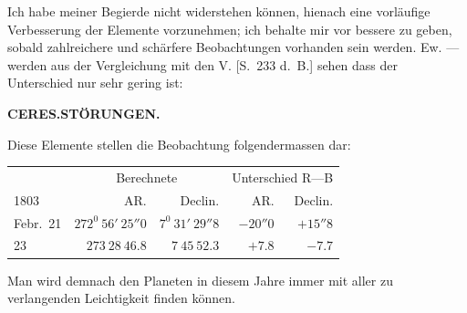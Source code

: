 Ich habe meiner Begierde nicht widerstehen können, hienach eine vorläufige Verbesserung der Elemente vorzunehmen; ich behalte mir vor bessere zu geben, sobald zahlreichere und schärfere Beobachtungen vorhanden sein werden. Ew. — werden aus der Vergleichung mit den V. [S.\ 233 d.\ B.] sehen dass der Unterschied nur sehr gering ist:
\clearpage
\thispagestyle{empty}
\noindent{}%
\makebox[12mm][l]{}%
\parbox[t]{\dimexpr\linewidth-24mm\relax}{\centering\footnotesize\bfseries CERES.\quad STÖRUNGEN.\par}%
\par\nobreak\medskip
\begin{center}\begingroup\fontsize{9}{11}\selectfont\setlength{\tabcolsep}{2.5pt}
%
\ifdim\wd0>\linewidth\resizebox{\linewidth}{!}{\usebox{0}}\else\usebox{0}\fi
\endgroup\end{center}

Diese Elemente stellen die Beobachtung folgendermassen dar:
\begin{center}
\begingroup\small\setlength{\tabcolsep}{4pt}
\begin{tabular}{l|r|r|r|r}
&\multicolumn{2}{c|}{Berechnete}&\multicolumn{2}{c}{Unterschied R—B}\\
1803&AR.&Declin.&AR.&Declin.\\\hline
Febr.\ 21&$272^0\ 56'\ 25''0$&$7^0\ 31'\ 29''8$&$-20''0$&$+15''8$\\
23&$273\ 28\ 46.8$&$7\ 45\ 52.3$&$+7.8$&$-7.7$
\end{tabular}\endgroup
\end{center}
Man wird demnach den Planeten in diesem Jahre immer mit aller zu verlangenden Leichtigkeit finden können.

